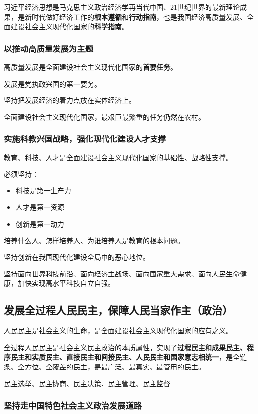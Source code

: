 \documentclass[12pt, a4paper, oneside]{ctexart}
\begin{document}
习近平经济思想是马克思主义政治经济学再当代中国、21世纪世界的最新理论成果，是新时代做好经济工作的\textbf{根本遵循}和\textbf{行动指南}，也是我国经济高质量发展、全面建设社会主义现代化国家的\textbf{科学指南}。

\subsubsection{以推动高质量发展为主题}

高质量发展是全面建设社会主义现代化国家的\textbf{首要任务}。

发展是党执政兴国的第一要务。

坚持把发展经济的着力点放在实体经济上。

全面建设社会主义现代化国家，最艰巨最繁重的任务仍然在农村。

\subsubsection{实施科教兴国战略，强化现代化建设人才支撑}

教育、科技、人才是全面建设社会主义现代化国家的基础性、战略性支撑。

必须坚持：
\begin{itemize}
  \item 科技是第一生产力
  \item 人才是第一资源
  \item 创新是第一动力
\end{itemize}

培养什么人、怎样培养人、为谁培养人是教育的根本问题。

坚持创新在我国现代化建设全局中的恶心地位。

坚持面向世界科技前沿、面向经济主战场、面向国家重大需求、面向人民生命健康，加快实现高水平科技自立自强。

\subsection{发展全过程人民民主，保障人民当家作主（政治）}

人民民主是社会主义的生命，是全面建设社会主义现代化国家的应有之义。

全过程人民民主是社会主义民主政治的本质属性，实现了\textbf{过程民主和成果民主、程序民主和实质民主、直接民主和间接民主、人民民主和国家意志相统一}，是全链条、全方位、全覆盖的民主，是最广泛、最真实、最管用的民主。

民主选举、民主协商、民主决策、民主管理、民主监督

\subsubsection{坚持走中国特色社会主义政治发展道路}
\end{document}
